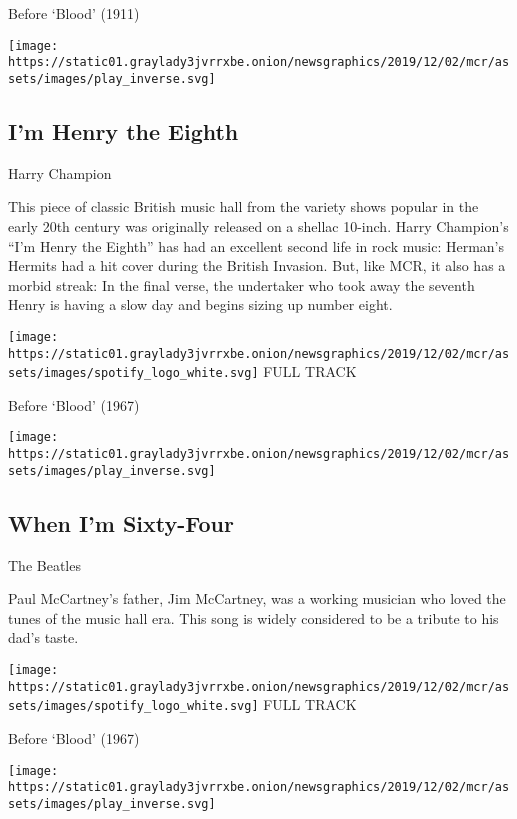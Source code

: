 Before `Blood' (1911)

\texttt{[image: https://static01.graylady3jvrrxbe.onion/newsgraphics/2019/12/02/mcr/assets/images/play\_inverse.svg]}

\hypertarget{im-henry-the-eighth}{%
\subsection{I'm Henry the Eighth}\label{im-henry-the-eighth}}

Harry Champion

This piece of classic British music hall from the variety shows popular
in the early 20th century was originally released on a shellac 10-inch.
Harry Champion's ``I'm Henry the Eighth'' has had an excellent second
life in rock music: Herman's Hermits had a hit cover during the British
Invasion. But, like MCR, it also has a morbid streak: In the final
verse, the undertaker who took away the seventh Henry is having a slow
day and begins sizing up number eight.

\href{https://open.spotify.com/track/15KdJuTdFZC4mdM6ZXoWs4?si=k5Wotd-sR06S3p5Lg9wa2g}{}

\texttt{[image: https://static01.graylady3jvrrxbe.onion/newsgraphics/2019/12/02/mcr/assets/images/spotify\_logo\_white.svg]}
FULL TRACK

Before `Blood' (1967)

\texttt{[image: https://static01.graylady3jvrrxbe.onion/newsgraphics/2019/12/02/mcr/assets/images/play\_inverse.svg]}

\hypertarget{when-im-sixty-four}{%
\subsection{When I'm Sixty-Four}\label{when-im-sixty-four}}

The Beatles

Paul McCartney's father, Jim McCartney, was a working musician who loved
the tunes of the music hall era. This song is widely considered to be a
tribute to his dad's taste.

\href{https://open.spotify.com/track/1NrbnHlR2BFREcyWXHIHip?si=nILS-B-cQQigVkaypS7LIA}{}

\texttt{[image: https://static01.graylady3jvrrxbe.onion/newsgraphics/2019/12/02/mcr/assets/images/spotify\_logo\_white.svg]}
FULL TRACK

Before `Blood' (1967)

\texttt{[image: https://static01.graylady3jvrrxbe.onion/newsgraphics/2019/12/02/mcr/assets/images/play\_inverse.svg]}

